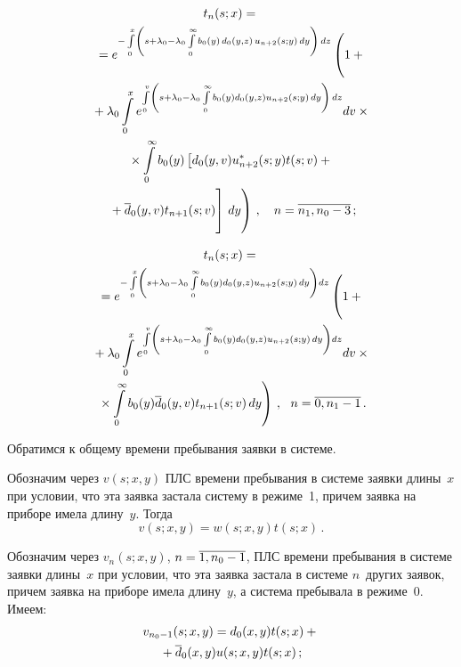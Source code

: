 \begin{multicols}{2}
\vspace*{-12pt}

\noindent
\begin{multline}
\label{5-4-2-m}
t_n(s;x)={}\\
{}= e^{-\int\limits_0^x \left( s + \lambda_0 -
\lambda_0 \int\limits_0^\infty b_0(y)\, d_0(y,z)\, u_{n+2}(s;y) \, dy
\right)\,dz} 
\left( \vphantom{\int\limits_0^\infty}
1 +{}\right.\\
{}+ \lambda_0 \int\limits_0^x e^{\int\limits_0^v \left(
s + \lambda_0 - \lambda_0 \int\limits_0^\infty b_0(y) d_0(y,z) u_{n+2}(s;y) \, dy
\right)\,dz} dv \times{}
\\
{}\times
\int\limits_0^\infty b_0(y) \left[d_0(y,v) u_{n+2}^*(s;y) t(s;v)+{}\right.\\
\left.\left.{}+ \overline d_0(y,v) t_{n+1}(s;v)
\vphantom{\int\limits_0^\infty}
\right] \, dy
\right) \,, \quad 
n=\overline{n_1,n_0-3}\,;
\end{multline}

\vspace*{-12pt}

\noindent
\begin{multline*}
t_n(s;x) = {}\\
{}=e^{-\int\limits_0^x\left( \vphantom{\int\limits_0^\infty}
s + \lambda_0 - \lambda_0 \int\limits_0^\infty b_0(y) d_0(y,z) u_{n+2}(s;y) \, dy \right)
dz} \left(  \vphantom{\int\limits_0^x}
1 +{}\right.\\
{}+ \lambda_0 \int\limits_0^x e^{\int\limits_0^v\left(
s + \lambda_0 -\lambda_0 \int\limits_0^\infty b_0(y) d_0(y,z) u_{n+2}(s;y) \, dy
\right) dz } dv \times{}\\
\left.{}\times
\int\limits_0^\infty b_0(y) \overline d_0(y,v) t_{n+1}(s;v) \, dy
\right)\,,
\ \ n=\overline{0,n_1-1}\,.
\end{multline*}

Обратимся к общему времени пребывания заявки в системе.

Обозначим через $v(s;x,y)$
ПЛС времени пребывания в системе заявки длины~$x$ при
условии, что эта заявка застала систему в режиме~1,
причем заявка на приборе имела длину~$y$.
Тогда
$$
v(s;x,y)= w(s;x,y) t(s;x)\,.
$$

Обозначим через
$v_{n}(s;x,y)$, $n\hm=\overline{1,n_0-1}$,
ПЛС времени пребывания в системе заявки длины~$x$ при
условии, что эта заявка застала в системе $n$~других
заявок, причем заявка на приборе имела длину~$y$, а
система пребывала в режиме~0.
Имеем:
\begin{multline}
\label{5-5-1-m}
v_{n_0-1}(s;x,y) = d_0(x,y) t(s;x) + {}\\
{}+\overline d_0(x,y) u(s;x,y) t(s;x)\,;
\end{multline}


\end{multicols}
